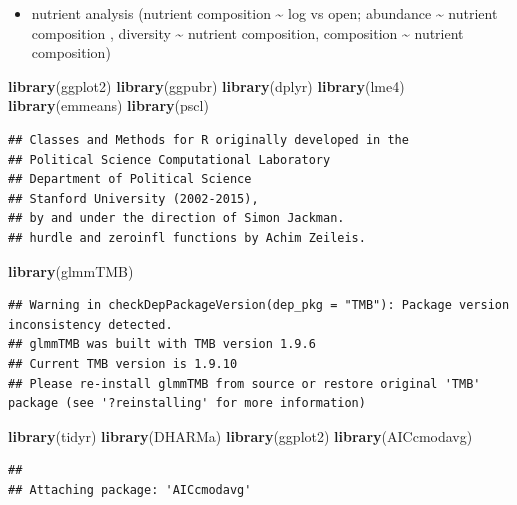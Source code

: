 \documentclass[
]{article}
\newenvironment{Shaded}{\begin{snugshade}}{\end{snugshade}}
\newcommand{\FunctionTok}[1]{\textcolor[rgb]{0.13,0.29,0.53}{\textbf{#1}}}
\newcommand{\NormalTok}[1]{#1}
\providecommand{\tightlist}{%
  \setlength{\itemsep}{0pt}\setlength{\parskip}{0pt}}
\begin{document}
\begin{itemize}
\tightlist
\item
  nutrient analysis (nutrient composition \textasciitilde{} log vs open;
  abundance \textasciitilde{} nutrient composition , diversity
  \textasciitilde{} nutrient composition, composition \textasciitilde{}
  nutrient composition)
\end{itemize}

\begin{Shaded}
\begin{Highlighting}[]
\FunctionTok{library}\NormalTok{(ggplot2)}
\FunctionTok{library}\NormalTok{(ggpubr)}
\FunctionTok{library}\NormalTok{(dplyr)}
\FunctionTok{library}\NormalTok{(lme4)}
\FunctionTok{library}\NormalTok{(emmeans)}
\FunctionTok{library}\NormalTok{(pscl)}
\end{Highlighting}
\end{Shaded}

\begin{verbatim}
## Classes and Methods for R originally developed in the
## Political Science Computational Laboratory
## Department of Political Science
## Stanford University (2002-2015),
## by and under the direction of Simon Jackman.
## hurdle and zeroinfl functions by Achim Zeileis.
\end{verbatim}

\begin{Shaded}
\begin{Highlighting}[]
\FunctionTok{library}\NormalTok{(glmmTMB)}
\end{Highlighting}
\end{Shaded}

\begin{verbatim}
## Warning in checkDepPackageVersion(dep_pkg = "TMB"): Package version inconsistency detected.
## glmmTMB was built with TMB version 1.9.6
## Current TMB version is 1.9.10
## Please re-install glmmTMB from source or restore original 'TMB' package (see '?reinstalling' for more information)
\end{verbatim}

\begin{Shaded}
\begin{Highlighting}[]
\FunctionTok{library}\NormalTok{(tidyr)}
\FunctionTok{library}\NormalTok{(DHARMa)}
\FunctionTok{library}\NormalTok{(ggplot2)}
\FunctionTok{library}\NormalTok{(AICcmodavg)}
\end{Highlighting}
\end{Shaded}

\begin{verbatim}
## 
## Attaching package: 'AICcmodavg'
\end{verbatim}
\end{document}
